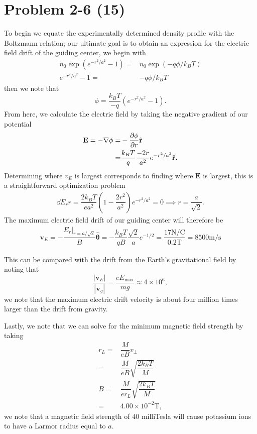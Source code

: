 \section*{Problem 2-6 (15)}
\label{sec:2-6}
To begin we equate the experimentally determined density profile with the Boltzmann relation; our ultimate goal is to obtain an expression for the electric field drift of the guiding center, we begin with
\begin{align}
	n_0\exp(e^{-r^2/a^2} - 1) =& n_0\exp(-q\phi/k_BT)\\
	e^{-r^2/a^2} - 1 =& -q\phi/k_BT
\end{align}
then we note that
\begin{equation}
	\phi = \dfrac{k_BT}{-q}\left(e^{-r^2/a^2}-1\right).
\end{equation}
From here, we calculate the electric field by taking the negative gradient of our potential
\begin{align}
	\textbf{E} = -\nabla \phi =& -\frac{\partial \phi}{\partial r}\hat{\textbf{r}} \\
	=& \dfrac{k_BT}{q} \dfrac{-2r}{a^2} e^{-r^2/a^2} \hat{\textbf{r}}.
\end{align}
Determining where \(v_E\) is largest corresponds to finding where \(\textbf{E}\) is largest, this is a straightforward optimization problem
\begin{align}
	\dd{E_r}{r} = \dfrac{2k_BT}{ea^2}\left(1 - \dfrac{2r^2}{a^2} \right)e^{-r^2/a^2} = 0 \implies r = \dfrac{a}{\sqrt{2}}.
\end{align}
The maximum electric field drift of our guiding center will therefore be
\begin{align}
	\textbf{v}_E = -\dfrac{E_r|_{r = a/\sqrt{2}}}{B} \hat{\bm{\theta}} = -\dfrac{k_BT}{qB}\dfrac{\sqrt{2}}{a}e^{-1/2} = \dfrac{17\text{N}/\text{C}}{0.2\text{T}} = 8500\text{m/s}
\end{align}

This can be compared with the drift from the Earth's gravitational field by noting that 
\begin{equation}
	\dfrac{|\textbf{v}_E|}{|\textbf{v}_g|} = \dfrac{eE_\text{max}}{mg} \approx 4\times 10^6,
\end{equation}
we note that the maximum electric drift velocity is about four million times larger than the drift from gravity.

Lastly, we note that we can solve for the minimum magnetic field strength by taking
\begin{align}
	r_L =& \dfrac{M}{eB} v_\perp \\
		=& \dfrac{M}{eB} \sqrt{\dfrac{2k_BT}{M}} \\
	B	=& \dfrac{M}{er_L} \sqrt{\dfrac{2k_BT}{M}} \\
	=& 4.00 \times 10^{-2}\text{T},
\end{align}
we note that a magnetic field strength of \(40\) milliTesla will cause potassium ions to have a Larmor radius equal to \(a\).

